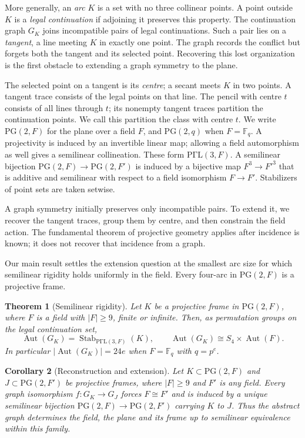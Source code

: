 \documentclass[11pt]{article}
\newtheorem{theorem}{Theorem}[section]
\newtheorem{corollary}[theorem]{Corollary}
\theoremstyle{definition}
\theoremstyle{remark}
\newcommand{\F}{\mathbb F}
\newcommand{\PG}{\mathrm{PG}}
\newcommand{\PGammaL}{\mathrm{P\Gamma L}}
\newcommand{\Aut}{\operatorname{Aut}}
\newcommand{\Stab}{\operatorname{Stab}}
\begin{document}
More generally, an \emph{arc} $K$ is a set with no three collinear points.
A point outside $K$ is a \emph{legal continuation} if adjoining it preserves
this property. The continuation graph $G_K$ joins incompatible pairs of
legal continuations. Such a pair lies on a \emph{tangent}, a line meeting
$K$ in exactly one point. The graph records the conflict but forgets both
the tangent and its selected point. Recovering this lost organization is
the first obstacle to extending a graph symmetry to the plane.

The selected point on a tangent is its \emph{centre}; a secant meets $K$
in two points. A tangent trace consists of the legal points on
that line. The pencil with centre $t$ consists of all lines through $t$;
its nonempty tangent traces partition the continuation points. We call this
partition the class with centre $t$.
We write $\PG(2,F)$ for the plane over a field $F$, and $\PG(2,q)$ when
$F=\F_q$. A projectivity is induced by an invertible linear map; allowing
a field automorphism as well gives a semilinear collineation. These form
$\PGammaL(3,F)$. A semilinear bijection $\PG(2,F)\to\PG(2,F')$ is induced
by a bijective map $F^3\to F'^3$ that is additive and semilinear with
respect to a field isomorphism $F\to F'$. Stabilizers of point sets are
taken setwise.

A graph symmetry initially preserves only incompatible pairs. To extend
it, we recover the tangent traces, group them by centre, and then constrain
the field action. The fundamental theorem of projective geometry applies
after incidence is known; it does not recover that incidence from a graph.

Our main result settles the extension question at the smallest arc size
for which semilinear rigidity holds uniformly in the field.  Every four-arc in $\PG(2,F)$ is a projective frame.

\begin{theorem}[Semilinear rigidity]\label{thm:main}
Let $K$ be a projective frame in $\PG(2,F)$, where $F$ is a field with
$|F|\ge9$, finite or infinite.  Then, as permutation groups on the legal
continuation set,
\[
  \Aut(G_K)=\Stab_{\PGammaL(3,F)}(K),
  \qquad \Aut(G_K)\cong S_4\times\Aut(F).
\]
In particular $|\Aut(G_K)|=24e$ when $F=\F_q$ with $q=p^e$.
\end{theorem}

\begin{corollary}[Reconstruction and extension]\label{cor:reconstruction}
Let $K\subset\PG(2,F)$ and $J\subset\PG(2,F')$ be projective frames,
where $|F|\ge9$ and $F'$ is any field. Every graph isomorphism
$f:G_K\to G_J$ forces $F\cong F'$ and is induced by a unique semilinear
bijection $\PG(2,F)\to\PG(2,F')$ carrying $K$ to $J$. Thus the abstract
graph determines the field, the plane and its frame up to semilinear
equivalence within this family.
\end{corollary}
\end{document}
